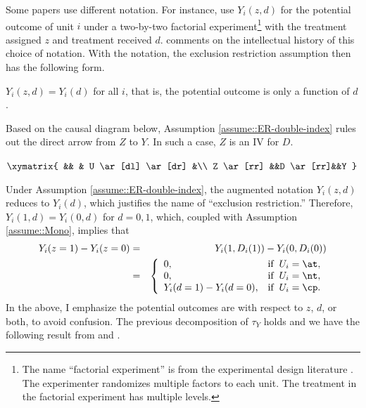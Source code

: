  

Some papers use different notation. For instance, \citet{angrist1996identification} use $Y_i(z,d)$ for the potential outcome of unit $i$ under a two-by-two factorial experiment\footnote{The name ``factorial experiment'' is from the experimental design literature \citep{dasgupta2014causal}. The experimenter randomizes multiple factors to each unit. The treatment in the factorial experiment has multiple levels.
} with the treatment assigned $z$ and treatment received $d$. \citet[][Section 3.1]{angrist2022empirical} comments on the intellectual history of this choice of notation. With the notation, the exclusion restriction assumption then has the following form.



\begin{assumption}
\label{assume::ER-double-index}
$Y_i(z,d) = Y_i(d)$ for all $i$, that is, the potential outcome is only a function of $d$.
\end{assumption}


Based on the causal diagram below, Assumption \ref{assume::ER-double-index} rules out the direct arrow from $Z$ to $Y$. In such a case, $Z$ is an IV for $D$. 
\begin{center}
$
\xymatrix{
 && & U  \ar[dl] \ar[dr] &\\
Z \ar[rr] &&D \ar[rr]&&Y
}
$
\end{center}
Under Assumption \ref{assume::ER-double-index}, the augmented notation $Y_i(z,d)$ reduces to $Y_i(d)$, which justifies the name of ``exclusion restriction.'' Therefore, $Y_i(1,d) = Y_i(0,d)$ for $d=0,1$, which, coupled with Assumption \ref{assume::Mono}, implies that
\begin{eqnarray*}
Y_i(z=1) - Y_i(z=0) &=& Y_i(1, D_i(1)) - Y_i(0, D_i(0)) \\
&=& \left \{ \begin{array} {ll}
0 , & \text{if} \hspace{2mm}  U_i = \at, \\
0 , & \text{if}  \hspace{2mm}  U_i = \nt,\\
Y_i(d=1) - Y_i(d=0) ,& \text{if} \hspace{2mm} U_i = \cp.
\end{array}
\right.  
\end{eqnarray*}
In the above, I emphasize the potential outcomes are with respect to $z$, $d$, or both, to avoid confusion. 
The previous decomposition of $\tau_Y$ holds and we have the following result from \citet{imbens1994identification} and \citet{angrist1996identification}.

